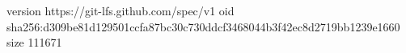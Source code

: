version https://git-lfs.github.com/spec/v1
oid sha256:d309be81d129501ccfa87bc30c730ddcf3468044b3f42ec8d2719bb1239e1660
size 111671

